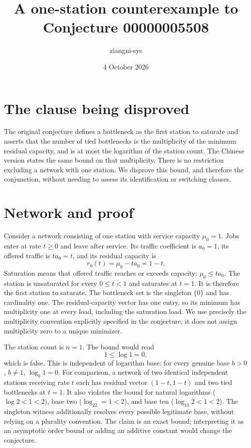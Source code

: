 \documentclass[10pt]{article}
\title{A one-station counterexample to Conjecture 00000005508}
\author{ziangni-sys}
\date{4 October 2026}
\begin{document}
\maketitle
\section*{The clause being disproved}
The original conjecture defines a bottleneck as the first station to saturate
and asserts that the number of tied bottlenecks is the multiplicity of the
minimum residual capacity, and is at most the logarithm of the station count.
The Chinese version states the same bound on that multiplicity.
There is no restriction excluding a network with one station.
We disprove this bound, and therefore the conjunction, without needing to
assess its identification or switching clauses.

\section*{Network and proof}
Consider a network consisting of one station with service capacity
$\mu_0=1$. Jobs enter at rate $t\geq0$ and leave after service.
Its traffic coefficient is $a_0=1$, its offered traffic is $ta_0=t$,
and its residual capacity is
\[
r_0(t)=\mu_0-ta_0=1-t.
\]
Saturation means that offered traffic reaches or exceeds capacity:
$\mu_0\leq ta_0$. The station is unsaturated for every $0\leq t<1$
and saturates at $t=1$. It is therefore the first station to saturate.
The bottleneck set is the singleton $\{0\}$ and has cardinality one.
The residual-capacity vector has one entry, so its minimum has
multiplicity one at every load, including the saturation load.
We use precisely the multiplicity convention explicitly specified in the
conjecture; it does not assign multiplicity zero to a unique minimizer.

The station count is $n=1$. The bound would read
\[
1\leq\log1=0,
\]
which is false. This is independent of logarithm base: for every genuine
base $b>0$, $b\neq1$, $\log_b1=0$.
For comparison, a network of two identical independent stations receiving
rate $t$ each has residual vector $(1-t,1-t)$ and two tied bottlenecks at
$t=1$. It also violates the bound for natural logarithms
($\log2<1<2$), base two ($\log_22=1<2$), and base ten
($\log_{10}2<1<2$). The singleton witness additionally resolves every
possible legitimate base, without relying on a plurality convention.
The claim is an exact bound; interpreting it as an asymptotic order bound
or adding an additive constant would change the conjecture.
\end{document}
